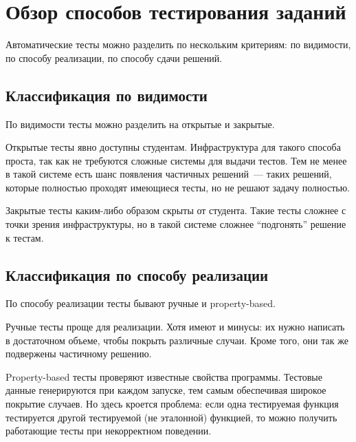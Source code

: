 

\section{Обзор способов тестирования заданий}
\label{subsec:types}

Автоматические тесты можно разделить по нескольким критериям: по видимости, по способу реализации, по способу сдачи решений.

\subsection{Классификация по видимости}

По видимости тесты можно разделить на открытые и закрытые.

Открытые тесты явно доступны студентам.
Инфраструктура для такого способа проста, так как не требуются сложные системы для выдачи тестов.
Тем не менее в такой системе есть шанс появления частичных решений~--- таких решений, которые полностью проходят имеющиеся тесты, но не решают задачу полностью.

Закрытые тесты каким-либо образом скрыты от студента.
Такие тесты сложнее с точки зрения инфраструктуры, но в такой системе сложнее \enquote{подгонять} решение к тестам.

\subsection{Классификация по способу реализации}

По способу реализации тесты бывают ручные и property-based.

Ручные тесты проще для реализации.
Хотя имеют и минусы: их нужно написать в достаточном объеме, чтобы покрыть различные случаи.
Кроме того, они так же подвержены частичному решению.

Property-based тесты проверяют известные свойства программы.
Тестовые данные генерируются при каждом запуске, тем самым обеспечивая широкое покрытие случаев.
Но здесь кроется проблема: если одна тестируемая функция тестируется другой тестируемой (не эталонной) функцией, то можно получить работающие тесты при некорректном поведении.

